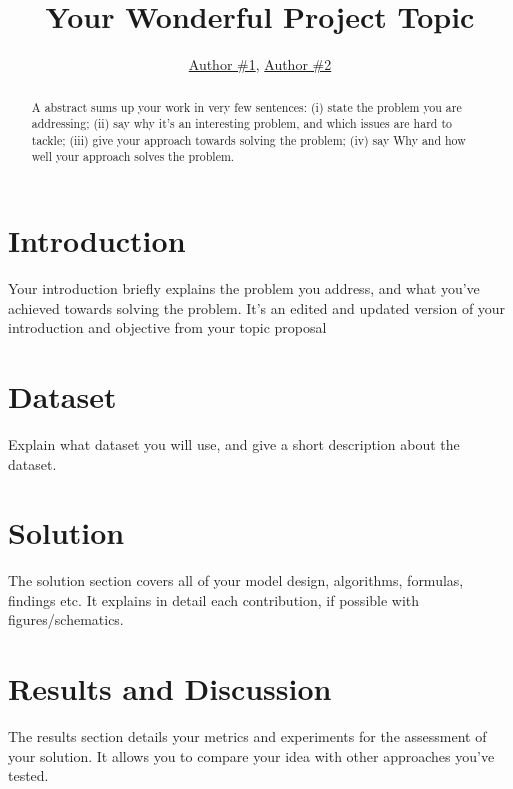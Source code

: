 \documentclass{article}
\title{Your Wonderful Project Topic}
\author{\href{mailto:author1@nyu.edu}{Author \#1}, \href{mailto:author2@nyu.edu}{Author \#2}}
\date{\vspace{-5ex}} %
\begin{document}
\maketitle
\thispagestyle{firstpage}


\begin{abstract}
    A abstract sums up your work in very few sentences:
    (i) state the problem you are addressing;
    (ii) say why it’s an interesting problem, and which issues are hard to tackle; 
    (iii) give your approach towards solving the problem; 
    (iv) say Why and how well your approach solves the problem.
\end{abstract}


\section*{Introduction}

Your introduction briefly explains the problem you address, and what you’ve achieved towards solving the problem. It’s an edited and updated version of your introduction and objective from your topic proposal



\section*{Dataset}

Explain what dataset you will use, and give a short description about the dataset. 

\section*{Solution}

The solution section covers all of your model design, algorithms, formulas, findings etc. It explains in detail each contribution, if possible with figures/schematics.

\section*{Results and Discussion}
The results section details your metrics and experiments for the assessment of your solution. It allows you to compare your idea with other approaches you've tested. 

\nocite{*}


\end{document}
